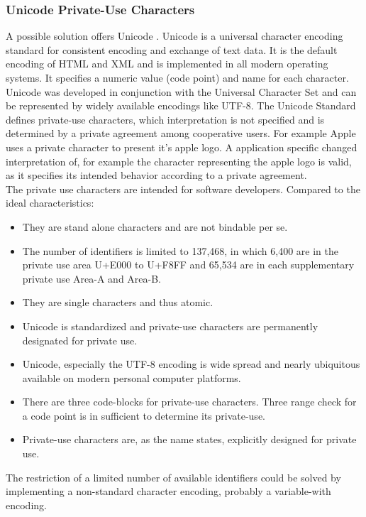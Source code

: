 \subsubsection{Unicode Private-Use Characters}
A possible solution offers Unicode \cite{Unicode}. Unicode is a universal character encoding standard for consistent encoding and exchange of text data. It is the default encoding of HTML and XML and is implemented in all modern operating systems. It specifies a numeric value (code point) and name for each character. Unicode was developed in conjunction with the Universal Character Set and can be represented by widely available encodings like UTF-8. The Unicode Standard defines private-use characters, which interpretation is not specified and is determined by a private agreement among cooperative users. For example Apple uses a private character to present it's apple logo. A application specific changed interpretation of, for example the character representing the apple logo is valid, as it specifies its intended behavior according to a private agreement.\\
The private use characters are intended for software developers. Compared to the ideal characteristics:
\begin{itemize}
	\item They are stand alone characters and are not bindable per se.
	\item The number of identifiers is limited to 137,468, in which 6,400 are in the private use area U+E000 to U+F8FF and 65,534 are in each supplementary private use Area-A and Area-B. 
	\item They are single characters and thus atomic. 
	\item Unicode is standardized and private-use characters are permanently designated for private use.
	\item Unicode, especially the UTF-8 encoding is wide spread and nearly ubiquitous available on modern personal computer platforms.
	\item There are three code-blocks for private-use characters. Three range check for a code point is in sufficient to determine its private-use.
	\item Private-use characters are, as the name states, explicitly designed for private use.
\end{itemize}
The restriction of a limited number of available identifiers could be solved by implementing a non-standard character encoding, probably a variable-with encoding.


